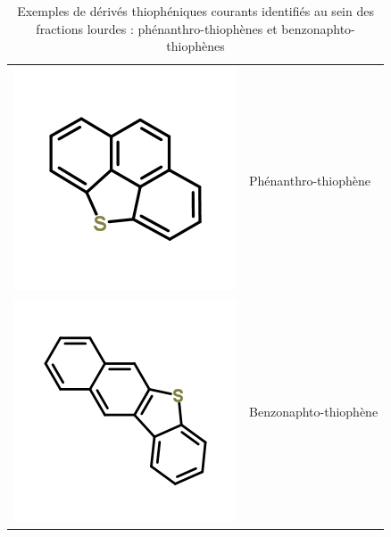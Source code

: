 \begin{table}[h!]
	\begin{center}
		\begin{tabular}{rl}
			\hline
			\includegraphics[scale=0.4]{image/phenanthro-thiophene} & Phénanthro-thiophène \\
			\includegraphics[scale=0.4]{image/benzo-naphto-thiophene} & Benzonaphto-thiophène \\
			\hline 
		\end{tabular}
	\end{center}
	\caption{Exemples de dérivés thiophéniques courants identifiés au sein des fractions lourdes : phénanthro-thiophènes et benzonaphto-thiophènes}
	\label{tab:soufre-ex}
\end{table}


